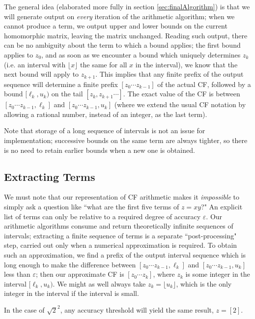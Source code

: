 \documentclass[11pt, oneside]{amsart}   	%
\begin{document}
The general idea (elaborated more fully in section \ref{sec:finalAlgorithm}) is that we will generate output on \emph{every}
 iteration of the arithmetic algorithm; when we cannot produce a term, we output upper and lower bounds on the current
 homomorphic matrix, leaving the matrix unchanged. Reading such output, there can be no ambiguity about the term to which a bound 
 applies; the first bound applies to $z_0$, and as soon as we encounter a bound which uniquely determines $z_k$ (i.e. an interval with
 $\lfloor x \rfloor$ the same for all $x$ in the interval), we know that the next bound will apply to $z_{k+1}$. This implies that any 
 finite prefix of the output sequence will determine a finite prefix $[z_0 \cdots z_{k-1}]$ of the actual CF, followed by a bound
 $[\ell_k,u_k)$ on the tail $[z_k, z_{k+1}\cdots]$. The exact value of the CF is between $[z_0 \cdots z_{k-1}, \ell_k]$ and
 $[z_0 \cdots z_{k-1}, u_k]$ (where we extend the usual CF notation by allowing a rational number, instead of an integer, as the last term).

Note that storage of a long sequence of intervals is not an issue for implementation;
successive bounds on the same term are always tighter, so there is no need to retain earlier bounds when a new one is obtained. 

\subsection{Extracting Terms}
We must note that our representation of CF arithmetic makes it \emph{impossible} to simply ask a question like ``what are the first
five terms of $z = xy$?" An explicit list of terms can only be relative to a required degree of accuracy $\varepsilon$. Our arithmetic
algorithms consume and return theoretically infinite sequences of intervals; extracting a finite sequence of terms is a separate
``post-processing" step, carried out only when a numerical approximation is required.
To obtain such an approximation, we find a prefix of
the output interval sequence which is long enough to make the difference between $[z_0 \cdots z_{k-1}, \ell_k]$ and $[z_0 \cdots
z_{k-1}, u_k]$ less than $\varepsilon$; then our approximate CF is $[z_0 \cdots z_k]$, where $z_k$ is some integer in the interval
$[\ell_k,u_k)$. We might as well always take $z_k = \lfloor u_k \rfloor$, which is the only integer in the interval if the interval is small. 

In the case of $\sqrt{2}^2$, any accuracy threshold will yield the same result, $z = [2]$.
\end{document}

